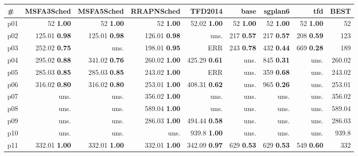 \begin{tabular}{|l|rrrrrrr|r|}
\hline
\textbf{\#} & \textbf{MSFA3Sched} & \textbf{MSFA5Sched} & \textbf{RRAPNSched} & \textbf{TFD2014} & \textbf{base} & \textbf{sgplan6} & \textbf{tfd} & \textbf{BEST}\\
\hline
p01 & {\footnotesize 52} \textbf{1.00} & {\footnotesize 52} \textbf{1.00} & {\footnotesize 52} \textbf{1.00} & {\footnotesize 52.02} \textbf{1.00} & {\footnotesize 52} \textbf{1.00} & {\footnotesize 52} \textbf{1.00} & {\footnotesize 52} \textbf{1.00} & 52\\
p02 & {\footnotesize 125.01} \textbf{0.98} & {\footnotesize 125.01} \textbf{0.98} & {\footnotesize 126.01} \textbf{0.98} & uns. & {\footnotesize 217} \textbf{0.57} & {\footnotesize 217} \textbf{0.57} & {\footnotesize 208} \textbf{0.59} & 123\\
p03 & {\footnotesize 252.02} \textbf{0.75} & uns. & {\footnotesize 198.01} \textbf{0.95} & ERR & {\footnotesize 243} \textbf{0.78} & {\footnotesize 432} \textbf{0.44} & {\footnotesize 669} \textbf{0.28} & 189\\
p04 & {\footnotesize 295.02} \textbf{0.88} & {\footnotesize 341.02} \textbf{0.76} & {\footnotesize 260.02} \textbf{1.00} & {\footnotesize 425.29} \textbf{0.61} & uns. & {\footnotesize 845} \textbf{0.31} & uns. & 260.02\\
p05 & {\footnotesize 285.03} \textbf{0.85} & {\footnotesize 285.03} \textbf{0.85} & {\footnotesize 243.02} \textbf{1.00} & ERR & uns. & {\footnotesize 359} \textbf{0.68} & uns. & 243.02\\
p06 & {\footnotesize 316.02} \textbf{0.80} & {\footnotesize 316.02} \textbf{0.80} & {\footnotesize 253.01} \textbf{1.00} & {\footnotesize 408.31} \textbf{0.62} & uns. & {\footnotesize 965} \textbf{0.26} & uns. & 253.01\\
p07 & uns. & uns. & {\footnotesize 356.02} \textbf{1.00} & uns. & uns. & uns. & uns. & 356.02\\
p08 & uns. & uns. & {\footnotesize 589.04} \textbf{1.00} & uns. & uns. & uns. & uns. & 589.04\\
p09 & uns. & uns. & {\footnotesize 286.03} \textbf{1.00} & {\footnotesize 494.44} \textbf{0.58} & uns. & uns. & uns. & 286.03\\
p10 & uns. & uns. & uns. & {\footnotesize 939.8} \textbf{1.00} & uns. & uns. & uns. & 939.8\\
p11 & {\footnotesize 332.01} \textbf{1.00} & {\footnotesize 332.01} \textbf{1.00} & {\footnotesize 332.01} \textbf{1.00} & {\footnotesize 342.09} \textbf{0.97} & {\footnotesize 629} \textbf{0.53} & {\footnotesize 629} \textbf{0.53} & {\footnotesize 549} \textbf{0.60} & 332\\

\end{tabular}
